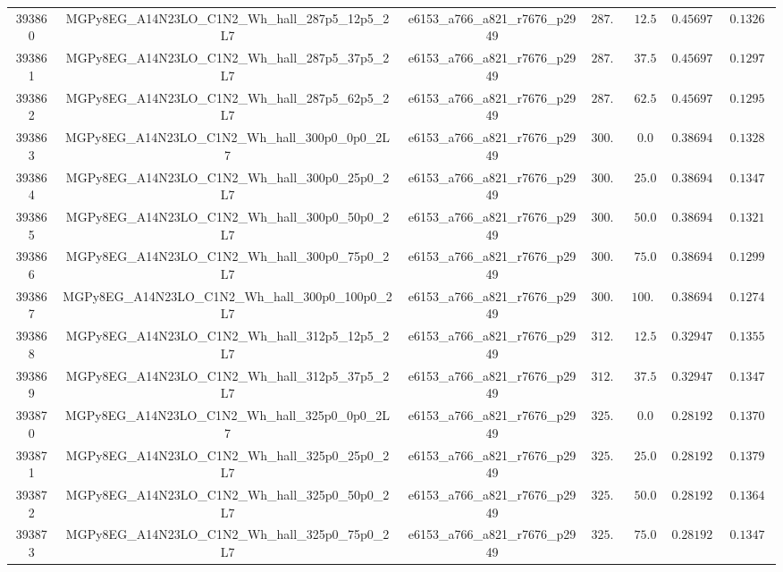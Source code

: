 \begin{table}[htbp]
\begin{center}
{\begin{tabular}{ccccccc}
393860 & MGPy8EG\_A14N23LO\_C1N2\_Wh\_hall\_287p5\_12p5\_2L7  & e6153\_a766\_a821\_r7676\_p2949 & $287.5$ & $12.5 $ & $0.456978  $ & $0.13264$ \\
393861 & MGPy8EG\_A14N23LO\_C1N2\_Wh\_hall\_287p5\_37p5\_2L7  & e6153\_a766\_a821\_r7676\_p2949 & $287.5$ & $37.5 $ & $0.456978  $ & $0.12975$ \\
393862 & MGPy8EG\_A14N23LO\_C1N2\_Wh\_hall\_287p5\_62p5\_2L7  & e6153\_a766\_a821\_r7676\_p2949 & $287.5$ & $62.5 $ & $0.456978  $ & $0.12952$ \\
393863 & MGPy8EG\_A14N23LO\_C1N2\_Wh\_hall\_300p0\_0p0\_2L7   & e6153\_a766\_a821\_r7676\_p2949 & $300.0$ & $0.0  $ & $0.386946  $ & $0.13283$ \\
393864 & MGPy8EG\_A14N23LO\_C1N2\_Wh\_hall\_300p0\_25p0\_2L7  & e6153\_a766\_a821\_r7676\_p2949 & $300.0$ & $25.0 $ & $0.386946  $ & $0.13473$ \\
393865 & MGPy8EG\_A14N23LO\_C1N2\_Wh\_hall\_300p0\_50p0\_2L7  & e6153\_a766\_a821\_r7676\_p2949 & $300.0$ & $50.0 $ & $0.386946  $ & $0.13213$ \\
393866 & MGPy8EG\_A14N23LO\_C1N2\_Wh\_hall\_300p0\_75p0\_2L7  & e6153\_a766\_a821\_r7676\_p2949 & $300.0$ & $75.0 $ & $0.386946  $ & $0.12999$ \\
393867 & MGPy8EG\_A14N23LO\_C1N2\_Wh\_hall\_300p0\_100p0\_2L7 & e6153\_a766\_a821\_r7676\_p2949 & $300.0$ & $100.0$ & $0.386946  $ & $0.12741$ \\
393868 & MGPy8EG\_A14N23LO\_C1N2\_Wh\_hall\_312p5\_12p5\_2L7  & e6153\_a766\_a821\_r7676\_p2949 & $312.5$ & $12.5 $ & $0.329476  $ & $0.13550$ \\
393869 & MGPy8EG\_A14N23LO\_C1N2\_Wh\_hall\_312p5\_37p5\_2L7  & e6153\_a766\_a821\_r7676\_p2949 & $312.5$ & $37.5 $ & $0.329476  $ & $0.13478$ \\
393870 & MGPy8EG\_A14N23LO\_C1N2\_Wh\_hall\_325p0\_0p0\_2L7   & e6153\_a766\_a821\_r7676\_p2949 & $325.0$ & $0.0  $ & $0.281924  $ & $0.13702$ \\
393871 & MGPy8EG\_A14N23LO\_C1N2\_Wh\_hall\_325p0\_25p0\_2L7  & e6153\_a766\_a821\_r7676\_p2949 & $325.0$ & $25.0 $ & $0.281924  $ & $0.13792$ \\
393872 & MGPy8EG\_A14N23LO\_C1N2\_Wh\_hall\_325p0\_50p0\_2L7  & e6153\_a766\_a821\_r7676\_p2949 & $325.0$ & $50.0 $ & $0.281924  $ & $0.13644$ \\
393873 & MGPy8EG\_A14N23LO\_C1N2\_Wh\_hall\_325p0\_75p0\_2L7  & e6153\_a766\_a821\_r7676\_p2949 & $325.0$ & $75.0 $ & $0.281924  $ & $0.13477$ \\

\end{tabular}}
\end{center}
\end{table}
